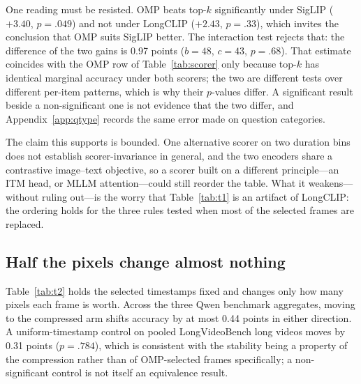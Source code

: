 \documentclass[11pt]{article}
\begin{document}
One reading must be resisted.
OMP beats top-$k$ significantly under SigLIP (${+}3.40$, $p{=}.049$) and not under LongCLIP (${+}2.43$, $p{=}.33$), which invites the conclusion that OMP suits SigLIP better.
The interaction test rejects that: the difference of the two gains is 0.97 points ($b{=}48$, $c{=}43$, $p{=}.68$).
That estimate coincides with the OMP row of Table~\ref{tab:scorer} only because top-$k$ has identical marginal accuracy under both scorers; the two are different tests over different per-item patterns, which is why their $p$-values differ.
A significant result beside a non-significant one is not evidence that the two differ, and Appendix~\ref{app:qtype} records the same error made on question categories.

The claim this supports is bounded.
One alternative scorer on two duration bins does not establish scorer-invariance in general, and the two encoders share a contrastive image--text objective, so a scorer built on a different principle---an ITM head, or MLLM attention---could still reorder the table.
What it weakens---without ruling out---is the worry that Table~\ref{tab:t1} is an artifact of LongCLIP: the ordering holds for the three rules tested when most of the selected frames are replaced.

\subsection{Half the pixels change almost nothing}
\label{sec:compression}

Table~\ref{tab:t2} holds the selected timestamps fixed and changes only how many pixels each frame is worth.
Across the three Qwen benchmark aggregates, moving to the compressed arm shifts accuracy by at most 0.44 points in either direction.
A uniform-timestamp control on pooled LongVideoBench long videos moves by 0.31 points ($p{=}.784$), which is consistent with the stability being a property of the compression rather than of OMP-selected frames specifically; a non-significant control is not itself an equivalence result.
\end{document}
